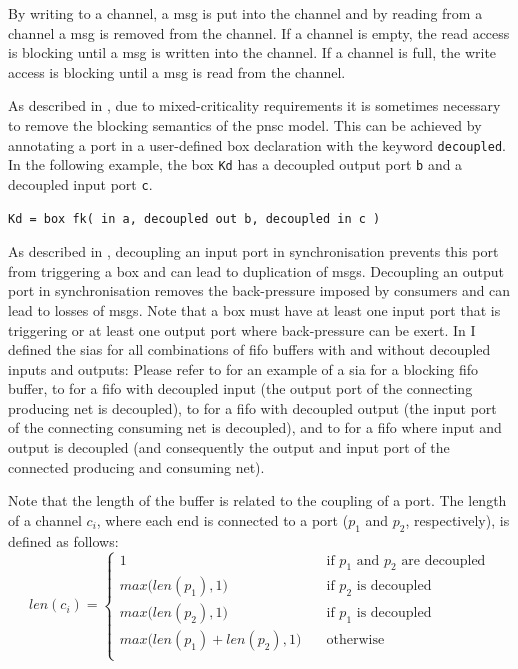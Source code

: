 By writing to a channel, a \gls*{msg} is put into the channel and by reading from a channel a \gls*{msg} is removed from the channel.
If a channel is empty, the read access is blocking until a \gls*{msg} is written into the channel.
If a channel is full, the write access is blocking until a \gls*{msg} is read from the channel.

As described in \Sect{\ref{sect_cci_decoupling}}, due to mixed-criticality requirements it is sometimes necessary to remove the blocking semantics of the \gls{pnsc} model.
This can be achieved by annotating a port in a user-defined box declaration with the keyword \texttt{decoupled}.
In the following example, the box \texttt{Kd} has a decoupled output port \texttt{b} and a decoupled input port \texttt{c}.
\begin{lstlisting}[numbers=none]
Kd = box fk( in a, decoupled out b, decoupled in c )
\end{lstlisting}
As described in \Sect{\ref{sect_cci_decoupling_sync}}, decoupling an input port in synchronisation prevents this port from triggering a box and can lead to duplication of \glspl*{msg}.
Decoupling an output port in synchronisation removes the back-pressure imposed by consumers and can lead to losses of \glspl*{msg}.
Note that a box must have at least one input port that is triggering or at least one output port where back-pressure can be exert.
In \Sect{\ref{sect_cci_decoupling_all}} I defined the \glspl{sia} for all combinations of \gls{fifo} buffers with and without decoupled inputs and outputs:
Please refer to \Fig{\ref{fig_sia_fifo}} for an example of a \gls{sia} for a blocking \gls{fifo} buffer, to \Fig{\ref{fig_sia_cci_in}} for a \gls{fifo} with decoupled input (the output port of the connecting producing net is decoupled), to \Fig{\ref{fig_sia_cci_out}} for a \gls{fifo} with decoupled output (the input port of the connecting consuming net is decoupled), and to \Fig{\ref{fig_sia_cci_bi}} for a \gls{fifo} where input and output is decoupled (and consequently the output and input port of the connected producing and consuming net).

Note that the length of the buffer is related to the coupling of a port.
The length of a channel $c_i$, where each end is connected to a port ($p_1$ and $p_2$, respectively), is defined as follows:
\begin{equation}
    len(c_i) =
        \begin{cases}
            1                                       & \quad \text{if } p_1 \text{ and } p_2 \text{ are decoupled}\\
            max \big (len(p_1), 1 \big )            & \quad \text{if } p_2 \text{ is decoupled}\\
            max \big (len(p_2), 1 \big )            & \quad \text{if } p_1 \text{ is decoupled}\\
            max \big (len(p_1) + len(p_2), 1 \big ) & \quad \text{otherwise}\\
        \end{cases}
    \label{eq_mirt_next_release}
\end{equation}

